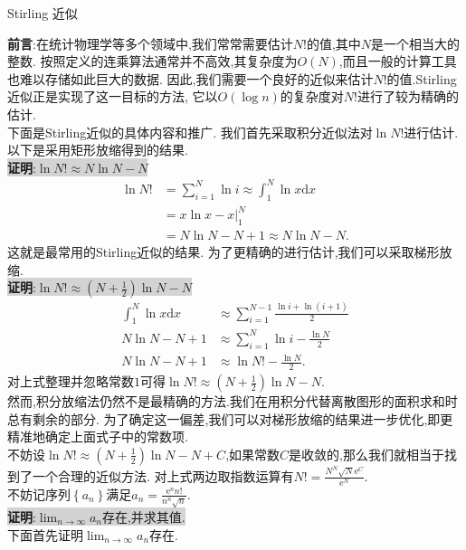\documentclass[a4paper,oneside]{ctexart}
\newcommand{\e}{\mathrm{e}}
\begin{document}
\pagestyle{empty}
\begin{center}\large Stirling 近似\end{center}
\textbf{前言}:在统计物理学等多个领域中,我们常常需要估计$N!$的值,其中$N$是一个相当大的整数.
按照定义的连乘算法通常并不高效,其复杂度为$O(N)$,而且一般的计算工具也难以存储如此巨大的数据.
因此,我们需要一个良好的近似来估计${N!}$的值.Stirling近似正是实现了这一目标的方法,
它以$O(\log{n})$的复杂度对$N!$进行了较为精确的估计.\\
下面是Stirling近似的具体内容和推广.
我们首先采取积分近似法对$\ln{N!}$进行估计.\\
以下是采用矩形放缩得到的结果.\\
\colorbox{lightgray}{\textbf{证明}:$\ln{N!}\approx N\ln{N}-N$}
$$\begin{aligned}
    \ln{N!} &=\sum_{i=1}^{N}{\ln i}\approx \int_{1}^{N} \ln{x}\mathrm{d}x \\
            &=\left.x\ln{x}-x\right|_{1}^{N} \\
            &=N\ln{N}-N+1\approx N\ln{N}-N.
\end{aligned}$$
这就是最常用的Stirling近似的结果.
为了更精确的进行估计,我们可以采取梯形放缩.\\
\colorbox{lightgray}{\textbf{证明}:$\ln{N!}\approx (N+\frac{1}{2})\ln{N}-N$}
$$\begin{aligned}
    \int_{1}^{N} \ln{x}\mathrm{d}x  &\approx \sum_{i=1}^{N-1}{\frac{\ln{i}+\ln{(i+1)}}{2}} \\
    N\ln{N}-N+1                     &\approx \sum_{i=1}^{N}{\ln i}-\frac{\ln{N}}{2} \\
    N\ln{N}-N+1                     &\approx \ln{N!}-\frac{\ln{N}}{2}.
\end{aligned}$$
对上式整理并忽略常数$1$可得$\ln{N!}\approx (N+\frac{1}{2})\ln{N}-N$.\\
然而,积分放缩法仍然不是最精确的方法.我们在用积分代替离散图形的面积求和时总有剩余的部分.
为了确定这一偏差,我们可以对梯形放缩的结果进一步优化,即更精准地确定上面式子中的常数项.\\
不妨设$\ln{N!}\approx (N+\frac{1}{2})\ln{N}-N+C$,如果常数$C$是收敛的,那么我们就相当于找到了一个合理的近似方法.
对上式两边取指数运算有$N!=\frac{N^N\sqrt{N}\e^C}{\e^N}.$\\
不妨记序列$\left\{a_n\right\}$满足$a_n=\frac{\e^nn!}{n^n\sqrt{n}}$.\\
\colorbox{lightgray}{\textbf{证明}:$\lim_{n\to\infty}{a_n}$存在,并求其值.}\\
下面首先证明$\lim_{n\to\infty}{a_n}$存在.\\
\end{document}
